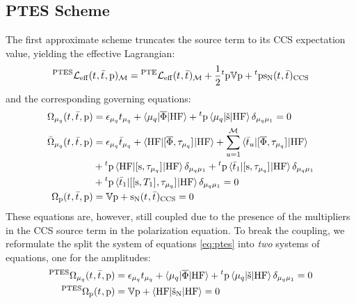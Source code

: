 \subsection*{PTES Scheme}

The first approximate scheme truncates the source term to its
\acrshort{CCS} expectation value, yielding the effective
Lagrangian:\autocite{Caricato2011-tx, Krause2016-ee}
\begin{equation}\label{eq:ptes-cc}
  {}^{\mathrm{PTES}}\mathcal{L}_\mathrm{eff}(t_{}, \bar{t}_{}, \mathrm{p})_\mathcal{M} =
  {}^\mathrm{PTE}\mathcal{L}_\mathrm{eff}(t_{}, \bar{t}_{})_\mathcal{M}
  + \frac{1}{2}{}^t\mathrm{p}\mathbb{V}\mathrm{p} + {}^t\mathrm{p}\mathrm{s}_{\mathrm{N}}(t_{},
  \bar{t}_{})_\mathrm{CCS}
\end{equation}
and the corresponding governing equations:
\begin{subequations}\label{eq:ptes}
  \begin{align}
   \Omega_{\mu_q}(t_{}, \bar{t}_{}, \mathrm{p})  &=
   \epsilon_{\mu_q}t_{\mu_q} + \braket{\mu_q | \overline{\Phi} | \mathrm{HF}}
   + {}^t\mathrm{p}\braket{\mu_q | \check{\mathrm{s}} | \mathrm{HF}}\delta_{\mu_q\mu_1}
             = 0 \\
   \bar{\Omega}_{\mu_q}(t_{}, \bar{t}_{}, \mathrm{p})
    &=
    \epsilon_{\mu_q}\bar{t}_{\mu_q} +
    \braket{\mathrm{HF} | [ \overline{\Phi}, \tau_{\mu_q} ]^{} | \mathrm{HF}} +
    \sum_{u=1}^{\mathcal{M}}\braket{\bar{t}_{u} |
    [ \overline{\Phi}, \tau_{\mu_q} ]^{} | \mathrm{HF}}
    \nonumber \\
    &+
    {}^t\mathrm{p}\braket{\mathrm{HF} | [ \mathrm{s}, \tau_{\mu_q} ]^{} | \mathrm{HF}}\delta_{\mu_q\mu_1}
    +
    {}^t\mathrm{p}\braket{\bar{t}_{1} |
    [ \mathrm{s}, \tau_{\mu_q} ]^{} | \mathrm{HF}}\delta_{\mu_q\mu_1}
     \nonumber \\
    &+
    {}^t\mathrm{p}\braket{\bar{t}_{1} |
    [ [ \mathrm{s}, T_1 ]^{}, \tau_{\mu_q} ]^{} | \mathrm{HF}}\delta_{\mu_q\mu_1}
             = 0 \\
    \Omega_{\mathrm{p}}(t_{}, \bar{t}_{}, \mathrm{p})
    &=
    \mathbb{V}\mathrm{p} + \mathrm{s}_{\mathrm{N}}(t_{}, \bar{t}_{})_\mathrm{CCS} = 0
    \label{eq:ptes-cc-polarization-amp}
  \end{align}
\end{subequations}
These equations are, however, still coupled due to the presence of the
multipliers in the \acrshort{CCS} source term in the polarization equation.
To break the coupling, we reformulate the split the system of equations
\eqref{eq:ptes} into \emph{two} systems of equations, one for the
amplitudes:
\begin{subequations}\label{eq:ptes-amp}
  \begin{align}
   {}^{\mathrm{PTES}}\Omega_{\mu_q}(t_{}, \bar{t}_{}, \mathrm{p})  &=
   \epsilon_{\mu_q}t_{\mu_q} + \braket{\mu_q | \overline{\Phi} | \mathrm{HF}}
   + {}^t\mathrm{p}\braket{\mu_q | \check{\mathrm{s}} | \mathrm{HF}}\delta_{\mu_q\mu_1}
             = 0 \label{eq:ptes-cc-amplitudes} \\
    {}^{\mathrm{PTES}}\Omega_{\mathrm{p}}(t_{}, \mathrm{p})
    &=
    \mathbb{V}\mathrm{p} +
    \braket{\mathrm{HF} | \check{\mathrm{s}}_{\mathrm{N}} | \mathrm{HF}} = 0
  \end{align}
\end{subequations}
